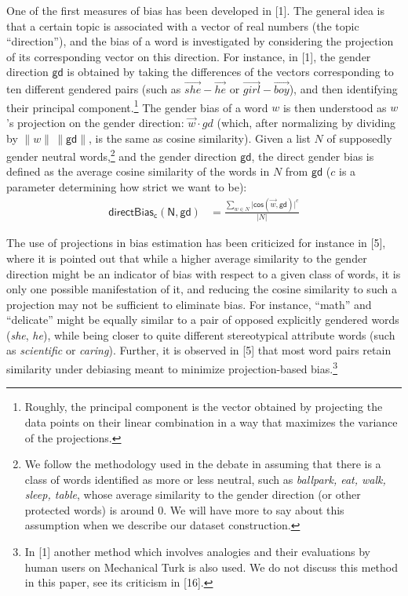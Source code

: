\documentclass[
  12pt,
  dvipsnames,enabledeprecatedfontcommands]{scrartcl}
\begin{document}
One of the first measures of bias has been developed in {[}1{]}. The
general idea is that a certain topic is associated with a vector of real
numbers (the topic ``direction''), and the bias of a word is
investigated by considering the projection of its corresponding vector
on this direction. For instance, in {[}1{]}, the gender direction
\(\mathsf{gd}\) is obtained by taking the differences of the vectors
corresponding to ten different gendered pairs (such as
\(\overrightarrow{she} - \overrightarrow{he}\) or
\(\overrightarrow{girl} - \overrightarrow{boy}\)), and then identifying
their principal component.\footnote{Roughly, the principal component is
  the vector obtained by projecting the data points on their linear
  combination in a way that maximizes the variance of the projections.}
The gender bias of a word \(w\) is then understood as \(w\)'s projection
on the gender direction: \(\vec{w} \cdot gd\) (which, after normalizing
by dividing by \(\lVert w \rVert \,\lVert \mathsf{gd} \rVert\), is the
same as cosine similarity). Given a list \(N\) of supposedly gender
neutral words,\footnote{We follow the methodology used in the debate in
  assuming that there is a class of words identified as more or less
  neutral, such as \emph{ballpark, eat, walk, sleep, table}, whose
  average similarity to the gender direction (or other protected words)
  is around 0. We will have more to say about this assumption when we
  describe our dataset construction.} and the gender direction
\(\mathsf{gd}\), the direct gender bias is defined as the average cosine
similarity of the words in \(N\) from \(\mathsf{gd}\) (\(c\) is a
parameter determining how strict we want to be): \begin{align*}
\mathsf{directBias_c(N,gd)} & = \frac{\sum_{w\in N}\vert \mathsf{cos}(\vec{w},\mathsf{gd})\vert^c}{\vert N \vert }
\end{align*} \normalsize 

The use of projections in bias estimation has been criticized for
instance in {[}5{]}, where it is pointed out that while a higher average
similarity to the gender direction might be an indicator of bias with
respect to a given class of words, it is only one possible manifestation
of it, and reducing the cosine similarity to such a projection may not
be sufficient to eliminate bias. For instance, ``math'' and ``delicate''
might be equally similar to a pair of opposed explicitly gendered words
(\emph{she}, \emph{he}), while being closer to quite different
stereotypical attribute words (such as \emph{scientific} or
\emph{caring}). Further, it is observed in {[}5{]} that most word pairs
retain similarity under debiasing meant to minimize projection-based
bias.\footnote{In {[}1{]} another method which involves analogies and
  their evaluations by human users on Mechanical Turk is also used. We
  do not discuss this method in this paper, see its criticism in
  {[}16{]}.}
\end{document}
